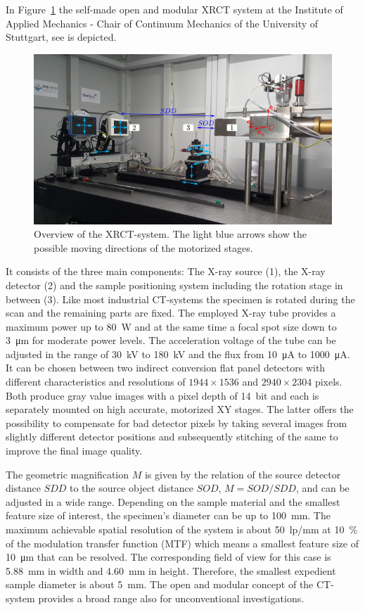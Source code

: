 In Figure~\ref{fig:CTsystem} the self-made open and modular {\textmu}XRCT system at the Institute of Applied Mechanics - Chair of Continuum Mechanics of the University of Stuttgart, see \cite{Ruf2020} is depicted. 
\begin{figure}[ht]
\centering
\includegraphics[width=1.0\textwidth]{figures/exp_2_2_xray_main.png}
\caption{Overview of the {\textmu}XRCT-system. The light blue arrows show the possible moving directions of the motorized stages.}
\label{fig:CTsystem}
\end{figure}
It consists of the three main components: The X-ray source (1), the X-ray detector (2) and the sample positioning system including the rotation stage in between (3). Like most industrial CT-systems the specimen is rotated during the scan and the remaining parts are fixed. The employed X-ray tube provides a maximum power up to \SI{80}{\watt} and at the same time a focal spot size down to \SI{3}{\micro\meter} for moderate power levels. The acceleration voltage of the tube can be adjusted in the range of \SI{30}{\kilo\volt} to \SI{180}{\kilo\volt} and the flux from \SI{10}{\micro\ampere} to \SI{1000}{\micro\ampere}. It can be chosen between two indirect conversion flat panel detectors with different characteristics and resolutions of $1944 \times 1536$ and $2940 \times 2304$ pixels. Both produce gray value images with a pixel depth of \SI{14}{bit} and each is separately mounted on high accurate, motorized XY stages. The latter offers the possibility to compensate for bad detector pixels by taking several images from slightly different detector positions and subsequently stitching of the same to improve the final image quality.

The geometric magnification $M$ is given by the relation of the source detector distance $SDD$ to the source object distance $SOD$, $M = SOD/SDD$, and can be adjusted in a wide range. Depending on the sample material and the smallest feature size of interest, the specimen's diameter can be up to \SI{100}{\milli\meter}. The maximum achievable spatial resolution of the system is about \SI{50}{lp/mm} at \SI{10}{\%} of the modulation transfer function (MTF) which means a smallest feature size of \SI{10}{\micro\meter} that can be resolved. The corresponding field of view for this case is \SI{5.88}{\milli\meter} in width and \SI{4.60}{\milli\meter} in height. Therefore, the smallest expedient sample diameter is about \SI{5}{\milli\meter}. The open and modular concept of the CT-system provides a broad range also for unconventional investigations.

